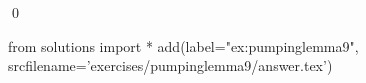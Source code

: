 
\begin{ex} 
  \label{ex:pumpinglemma9}
  
  \qed
\end{ex} 
\begin{python0}
from solutions import *
add(label="ex:pumpinglemma9",
    srcfilename='exercises/pumpinglemma9/answer.tex') 
\end{python0}
